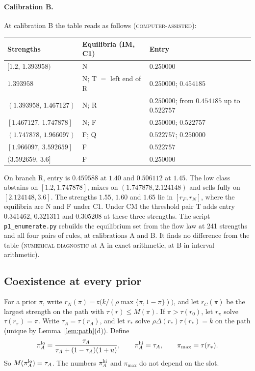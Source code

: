 \documentclass[11pt]{article}
\theoremstyle{definition}
\newcommand{\fr}{\mathfrak r}
\newcommand{\lab}[1]{\textsc{#1}}
\begin{document}
\paragraph{Calibration B.} At calibration B the table reads as follows (\lab{computer-assisted}):
\begin{center}
\small
\begin{tabular}{@{}lll@{}}
\toprule
Strengths & Equilibria (IM, C1) & Entry\\
\midrule
$[1.2,\,1.393958)$ & N & $0.250000$\\
$1.393958$ & N; T $=$ left end of R & $0.250000$; $0.454185$\\
$(1.393958,\,1.467127)$ & N; R & $0.250000$; from $0.454185$ up to $0.522757$\\
$[1.467127,\,1.747878]$ & N; F & $0.250000$; $0.522757$\\
$(1.747878,\,1.966097)$ & F; Q & $0.522757$; $0.250000$\\
$[1.966097,\,3.592659]$ & F & $0.522757$\\
$(3.592659,\,3.6]$ & F & $0.250000$\\
\bottomrule
\end{tabular}
\end{center}
On branch R, entry is $0.459588$ at $1.40$ and $0.506112$ at $1.45$. The low class abstains on
$[1.2,1.747878]$, mixes on $(1.747878,2.124148)$ and sells fully on $[2.124148,3.6]$. The strengths $1.55$, $1.60$
and $1.65$ lie in $[r_F,r_N]$, where the equilibria are N and F under C1. Under CM the threshold pair T adds
entry $0.341462$, $0.321311$ and $0.305208$ at these three strengths. The script \texttt{p1\_enumerate.py} rebuilds
the equilibrium set from the flow law at 241 strengths and all four pairs of rules, at calibrations A and B.
It finds no difference from the table (\lab{numerical diagnostic} at A in exact arithmetic, at B in interval
arithmetic).

\subsection{Coexistence at every prior}

For a prior $\pi$, write $r_N(\pi)=\fr\big(k/(\rho\max\{\pi,1-\pi\})\big)$, and let $r_C(\pi)$ be the largest
strength on the path with $\tau(r)\le M(\pi)$. If $\pi>\tau(r_0)$, let $r_\pi$ solve $\tau(r_\pi)=\pi$. Write
$\tau_A=\tau(r_A)$, and let $r_*$ solve $\rho\Delta(r_*)\tau(r_*)=k$ on the path (unique by
Lemma~\ref{lem:path}(d)). Define
\[
\pi_A^{\rm lo}=\frac{\tau_A}{\tau_A+(1-\tau_A)(1+u)},\qquad \pi_A^{\rm hi}=\tau_A,\qquad \pi_{\max}=\tau(r_*).
\]
So $M(\pi_A^{\rm lo})=\tau_A$. The numbers $\pi_A^{\rm hi}$ and $\pi_{\max}$ do not depend on the slot.
\end{document}
